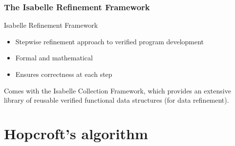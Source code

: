 \documentclass{beamer}
\theoremstyle{definition}
\begin{document}
\begin{frame}
  \frametitle{The Isabelle Refinement Framework}


  \begin{block}{Isabelle Refinement Framework}
    \begin{itemize}
      \item Stepwise refinement approach to verified program development
      \item Formal and mathematical
      \item Ensures correctness at each step
    \end{itemize}
  \end{block}
  Comes with the Isabelle Collection Framework, which provides an extensive library of reusable verified functional data structures (for data refinement).
\end{frame}

\section{Hopcroft's algorithm}

\begin{frame}
    \tableofcontents[currentsection]
\end{frame}
\end{document}
